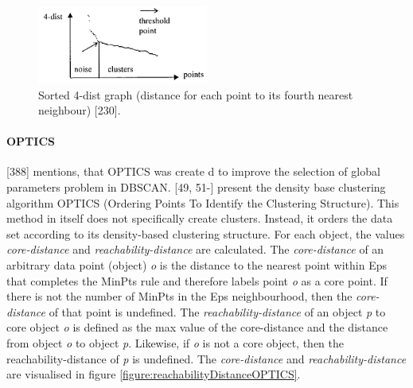 \begin{figure}[h]
  \centering
  \includegraphics[width=0.5\textwidth]{./images/sortedKGraphDBSCAN.png}
  \caption{Sorted 4-dist graph (distance for each point to its fourth nearest neighbour) \autocite{DBSCAN}[230].}
  \label{figure:sortedKGraphDBSCAN}
\end{figure}




\paragraph{OPTICS}
\textcite{han2011data}[388] mentions, that OPTICS was create d to improve the selection of global parameters problem in DBSCAN.
\textcite{OPTICS}[49, 51-] present the density base clustering algorithm OPTICS (Ordering Points To Identify the Clustering Structure). This method in itself does not specifically create clusters. Instead, it orders the data set according to its density-based clustering structure. For each object, the values \textit{core-distance} and \textit{reachability-distance} are calculated. The \textit{core-distance} of an arbitrary data point (object) \textit{o} is the distance to the nearest point within Eps that completes the MinPts rule and therefore labels point \textit{o} as a core point. If there is not the number of MinPts in the Eps neighbourhood, then the \textit{core-distance} of that point is undefined. The \textit{reachability-distance} of an object \textit{p} to core object \textit{o}  is defined as the max value of the core-distance and the distance from object \textit{o} to object \textit{p}. Likewise, if \textit{o} is not a core object, then the {reachability-distance} of \textit{p} is undefined. The \textit{core-distance} and \textit{reachability-distance} are visualised in figure \ref{figure:reachabilityDistanceOPTICS}.

